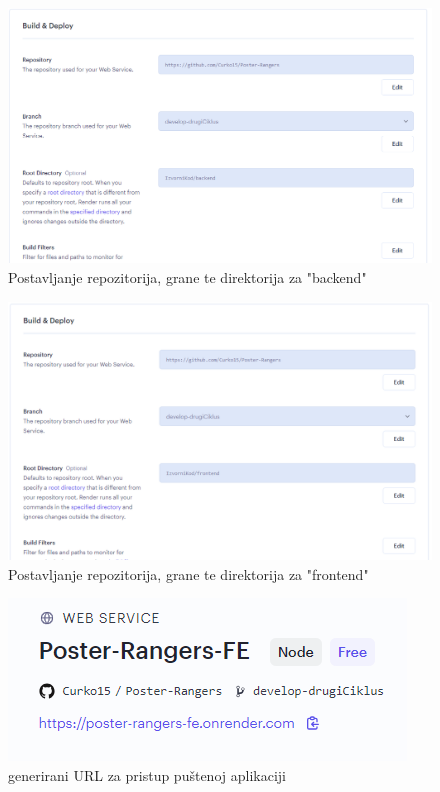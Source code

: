 			\begin{figure}[H]
				\includegraphics[width=\textwidth]{slike/BE_setup.png} %
				\caption{Postavljanje repozitorija, grane te direktorija za "backend"}
				\label{fig:BE_setup} %
			\end{figure}
			
			\begin{figure}[H]
				\includegraphics[width=\textwidth]{slike/FE_setup.png} %
				\caption{Postavljanje repozitorija, grane te direktorija za "frontend"}
				\label{fig:FE_setup} %
			\end{figure}
			
			\begin{figure}[H]
				\includegraphics[width=\textwidth]{slike/deployed_URL.png} %
				\caption{generirani URL za pristup puštenoj aplikaciji}
				\label{fig:deployed_URL} %
			\end{figure}
			
			
			\eject 